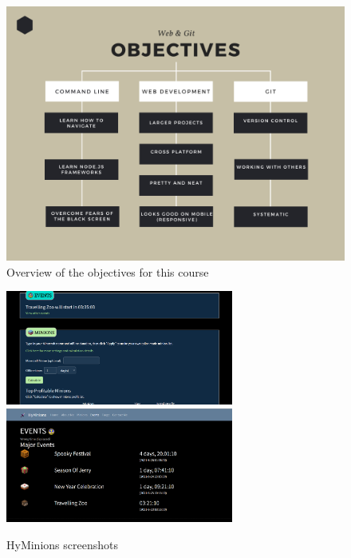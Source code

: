 \begin{figure}[H]
\centering
\includegraphics[width=15cm]{images/chn0-objectives.png}
\caption{Overview of the objectives for this course}
\label{fig:objective}
\end{figure}

\newpage
\begin{figure}[H]
\centering
\includegraphics[width=7.5cm]{images/chn0-code-hyminions-1.png}
\includegraphics[width=7.5cm]{images/chn0-code-hyminions-2.png}
\caption{HyMinions screenshots}
\end{figure}


